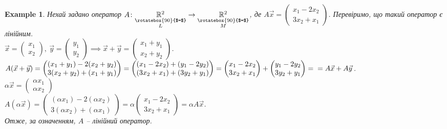 \documentclass[a4paper, 10pt]{article}
\theoremstyle{theoremdd}
\newtheorem{example}[theorem]{Example}
\begin{document}
	\begin{example}
	Нехай задано оператор $A \colon \underset{\substack{\rotatebox{90}{$=$} \\ L}}{\mathbb{R}^2} \to \underset{\substack{\rotatebox{90}{$=$} \\ M}}{\mathbb{R}^2}$, де \quad $\displaystyle A\vec{x} = \begin{pmatrix} x_1 - 2x_2 \\ 3x_2 + x_1 \end{pmatrix}$. Перевіримо, що такий оператор є лінійним.\\
	$\displaystyle \vec{x} = \begin{pmatrix} x_1 \\ x_2 \end{pmatrix},\ \vec{y} = \begin{pmatrix} y_1 \\ y_2 \end{pmatrix} \implies \vec{x} + \vec{y} = \begin{pmatrix}
	x_1 + y_1 \\ x_2 + y_2
	\end{pmatrix}$.\\
	$A(\vec{x} + \vec{y}) = \begin{pmatrix} (x_1+y_1)-2(x_2+y_2) \\ 3(x_2+y_2)+(x_1+y_1) \end{pmatrix} = \begin{pmatrix} (x_1-2x_2) + (y_1-2y_2) \\ (3x_2+x_1) + (3y_2+y_1) \end{pmatrix} = \begin{pmatrix} x_1 - 2x_2 \\ 3x_2 + x_1 \end{pmatrix} + \begin{pmatrix} y_1 - 2y_2 \\ 3y_2 + y_1 \end{pmatrix} = \\ = A\vec{x} + A\vec{y}$.\\
	$\alpha \vec{x} = \begin{pmatrix} \alpha x_1 \\ \alpha x_2 \end{pmatrix}$\\
	$A(\alpha \vec{x}) = \begin{pmatrix} (\alpha x_1) - 2(\alpha x_2) \\ 3(\alpha x_2) + (\alpha x_1) \end{pmatrix} = \alpha \begin{pmatrix} x_1 - 2x_2 \\ 3x_2 + x_1 \end{pmatrix} = \alpha A\vec{x}$.\\
	Отже, за означенням, $A$ -- лінійний оператор.
	\end{example}
	
\end{document}
